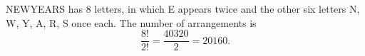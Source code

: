NEWYEARS has $8$ letters, in which E appears twice and the other six letters N, W, Y, A, R, S once each. The number of arrangements is
\[
\dfrac{8!}{2!}=\dfrac{40320}{2}=\boxed{20160}.
\]
